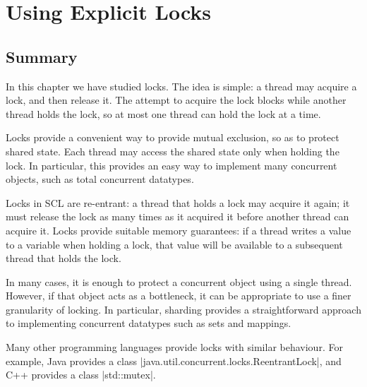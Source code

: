 \chapter{Using Explicit Locks} 
\label{chap:locks}



\section{Summary}

In this chapter we have studied locks.  The idea is simple: a thread may
acquire a lock, and then release it.  The attempt to acquire the lock blocks
while another thread holds the lock, so at most one thread can hold the lock
at a time.

Locks provide a convenient way to provide mutual exclusion, so as to protect
shared state.  Each thread may access the shared state only when holding the
lock.  In particular, this provides an easy way to implement many concurrent
objects, such as total concurrent datatypes.

Locks in SCL are re-entrant: a thread that holds a lock may acquire it again;
it must release the lock as many times as it acquired it before another thread
can acquire it.  Locks provide suitable memory guarantees: if a thread writes
a value to a variable when holding a lock, that value will be available to a
subsequent thread that holds the lock.

In many cases, it is enough to protect a concurrent object using a single
thread.  However, if that object acts as a bottleneck, it can be appropriate
to use a finer granularity of locking.  In particular, sharding provides a
straightforward approach to implementing concurrent datatypes such as sets and
mappings. 


Many other programming languages provide locks with similar behaviour.  For
example, Java provides a class |java.util.concurrent.locks.ReentrantLock|, and
C++ provides a class |std::mutex|.



\exercises









